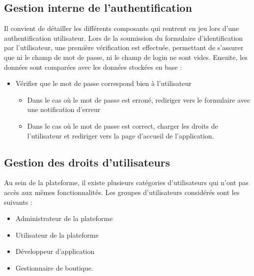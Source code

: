 \documentclass[a4paper,12pt]{report}
\begin{document}
\begin{onehalfspace}
\subsection{Gestion interne de l’authentification}
Il convient de détailler les différents composants qui rentrent en jeu lors d’une authentification utilisateur. Lors de la soumission du formulaire d’identification par l’utilisateur, une première vérification est effectuée, permettant de s’assurer que ni le champ de mot de passe, ni le champ de login ne sont vides. Ensuite, les données sont comparées avec les données stockées en base :
\begin{itemize}
  \item Vérifier que le mot de passe correspond bien à l’utilisateur
  \begin{itemize}
    \item Dans le cas où le mot de passe est erroné, rediriger vers le formulaire avec une notification d’erreur
    \item Dans le cas où le mot de passe est correct, charger les droits de l’utilisateur et rediriger vers la page d’accueil de l’application.
  \end{itemize}
\end{itemize}

\subsection{Gestion des droits d’utilisateurs}
Au sein de la plateforme, il existe plusieurs catégories d’utilisateurs qui n’ont pas accès aux mêmes fonctionnalités. Les groupes d’utilisateurs considérés sont les suivants :
\begin{itemize}
  \item Administrateur de la plateforme
  \item Utilisateur de la plateforme
  \item Développeur d'application
  \item Gestionnaire de boutique.
\end{itemize}

  \end{onehalfspace}
\end{document}
